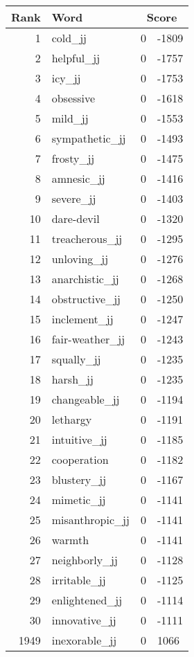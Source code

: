 \begin{longtable}[!htbp]{| rlr@{.}l |}
    \hline
    \textbf{Rank} & \textbf{Word} & \multicolumn{2}{c|}{\textbf{Score}} \\
    \hline
    \endhead
    1 & cold\_jj & 0 & -1809 \\
    2 & helpful\_jj & 0 & -1757 \\
    3 & icy\_jj & 0 & -1753 \\
    4 & obsessive & 0 & -1618 \\
    5 & mild\_jj & 0 & -1553 \\
    6 & sympathetic\_jj & 0 & -1493 \\
    7 & frosty\_jj & 0 & -1475 \\
    8 & amnesic\_jj & 0 & -1416 \\
    9 & severe\_jj & 0 & -1403 \\
    10 & dare-devil & 0 & -1320 \\
    11 & treacherous\_jj & 0 & -1295 \\
    12 & unloving\_jj & 0 & -1276 \\
    13 & anarchistic\_jj & 0 & -1268 \\
    14 & obstructive\_jj & 0 & -1250 \\
    15 & inclement\_jj & 0 & -1247 \\
    16 & fair-weather\_jj & 0 & -1243 \\
    17 & squally\_jj & 0 & -1235 \\
    18 & harsh\_jj & 0 & -1235 \\
    19 & changeable\_jj & 0 & -1194 \\
    20 & lethargy & 0 & -1191 \\
    21 & intuitive\_jj & 0 & -1185 \\
    22 & cooperation & 0 & -1182 \\
    23 & blustery\_jj & 0 & -1167 \\
    24 & mimetic\_jj & 0 & -1141 \\
    25 & misanthropic\_jj & 0 & -1141 \\
    26 & warmth & 0 & -1141 \\
    27 & neighborly\_jj & 0 & -1128 \\
    28 & irritable\_jj & 0 & -1125 \\
    29 & enlightened\_jj & 0 & -1114 \\
    30 & innovative\_jj & 0 & -1111 \\
    1949 & inexorable\_jj & 0 & 1066 \\

\end{longtable}
